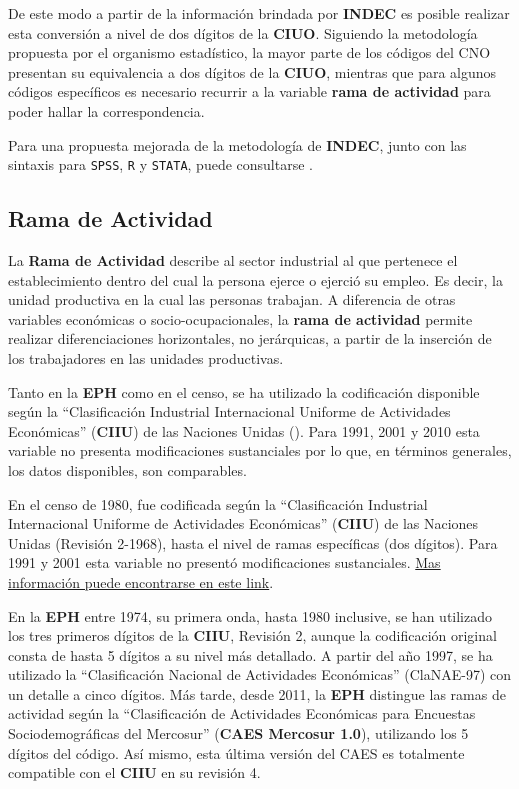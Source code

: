\documentclass[
]{book}
\begin{document}
De este modo a partir de la información brindada por \textbf{INDEC} \citep{INDEC2018b, ChavezMolina.etal2020} es posible realizar esta conversión a nivel de dos dígitos de la \textbf{CIUO}. Siguiendo la metodología propuesta por el organismo estadístico, la mayor parte de los códigos del CNO presentan su equivalencia a dos dígitos de la \textbf{CIUO}, mientras que para algunos códigos específicos es necesario recurrir a la variable \textbf{rama de actividad} para poder hallar la correspondencia.

Para una propuesta mejorada de la metodología de \textbf{INDEC}, junto con las sintaxis para \texttt{SPSS}, \texttt{R} y \texttt{STATA}, puede consultarse \citet{ChavezMolina.etal2020}.

\hypertarget{rama-de-actividad}{%
\subsection{Rama de Actividad}\label{rama-de-actividad}}

La \textbf{Rama de Actividad} describe al sector industrial al que pertenece el establecimiento dentro del cual la persona ejerce o ejerció su empleo. Es decir, la unidad productiva en la cual las personas trabajan. A diferencia de otras variables económicas o socio-ocupacionales, la \textbf{rama de actividad} permite realizar diferenciaciones horizontales, no jerárquicas, a partir de la inserción de los trabajadores en las unidades productivas.

Tanto en la \textbf{EPH} como en el censo, se ha utilizado la codificación disponible según la ``Clasificación Industrial Internacional Uniforme de Actividades Económicas'' (\textbf{CIIU}) de las Naciones Unidas (\citeyearpar{ONU2009a}). Para 1991, 2001 y 2010 esta variable no presenta modificaciones sustanciales por lo que, en términos generales, los datos disponibles, son comparables.

En el censo de 1980, fue codificada según la ``Clasificación Industrial Internacional Uniforme de Actividades Económicas'' (\textbf{CIIU}) de las Naciones Unidas (Revisión 2-1968), hasta el nivel de ramas específicas (dos dígitos). Para 1991 y 2001 esta variable no presentó modificaciones sustanciales. \href{https://www.indec.gob.ar/micro_sitios/clanae/default.asp}{Mas información puede encontrarse en este link}.

En la \textbf{EPH} entre 1974, su primera onda, hasta 1980 inclusive, se han utilizado los tres primeros dígitos de la \textbf{CIIU}, Revisión 2, aunque la codificación original consta de hasta 5 dígitos a su nivel más detallado. A partir del año 1997, se ha utilizado la ``Clasificación Nacional de Actividades Económicas'' (ClaNAE-97) con un detalle a cinco dígitos. Más tarde, desde 2011, la \textbf{EPH} distingue las ramas de actividad según la ``Clasificación de Actividades Económicas para Encuestas Sociodemográficas del Mercosur'' (\textbf{CAES Mercosur 1.0}), utilizando los 5 dígitos del código. Así mismo, esta última versión del CAES es totalmente compatible con el \textbf{CIIU} en su revisión 4.
\end{document}
